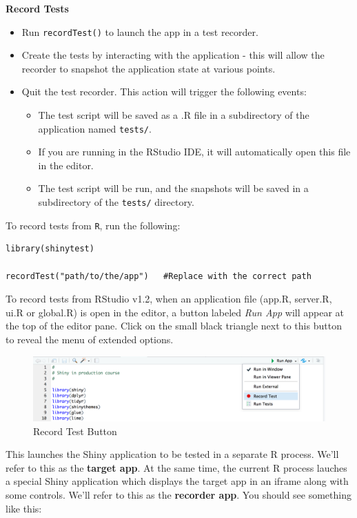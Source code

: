 \documentclass[]{book}
\providecommand{\tightlist}{%
  \setlength{\itemsep}{0pt}\setlength{\parskip}{0pt}}
\theoremstyle{definition}
\theoremstyle{definition}
\theoremstyle{definition}
\theoremstyle{remark}
\begin{document}
\textbf{Record Tests}

\begin{itemize}
\tightlist
\item
  Run \texttt{recordTest()} to launch the app in a test recorder.
\item
  Create the tests by interacting with the application - this will allow
  the recorder to snapshot the application state at various points.
\item
  Quit the test recorder. This action will trigger the following events:

  \begin{itemize}
  \tightlist
  \item
    The test script will be saved as a .R file in a subdirectory of the
    application named \texttt{tests/}.
  \item
    If you are running in the RStudio IDE, it will automatically open
    this file in the editor.
  \item
    The test script will be run, and the snapshots will be saved in a
    subdirectory of the \texttt{tests/} directory.
  \end{itemize}
\end{itemize}

To record tests from \texttt{R}, run the following:

\begin{verbatim}
library(shinytest)

recordTest("path/to/the/app")   #Replace with the correct path
\end{verbatim}

To record tests from RStudio v1.2, when an application file (app.R,
server.R, ui.R or global.R) is open in the editor, a button labeled
\emph{Run App} will appear at the top of the editor pane. Click on the
small black triangle next to this button to reveal the menu of extended
options.

\begin{figure}
\centering
\includegraphics{imgs/testing/record_test_button.png}
\caption{Record Test Button}
\end{figure}

This launches the Shiny application to be tested in a separate R
process. We'll refer to this as the \textbf{target app}. At the same
time, the current R process lauches a special Shiny application which
displays the target app in an iframe along with some controls. We'll
refer to this as the \textbf{recorder app}. You should see something
like this:
\end{document}
